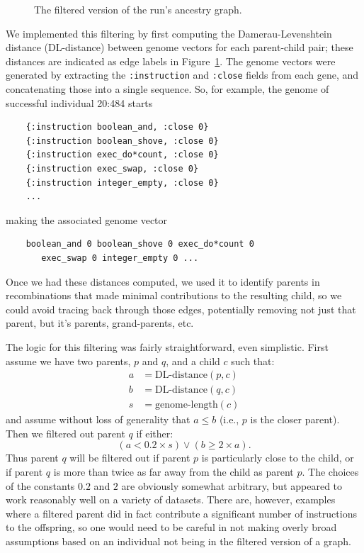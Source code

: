 \begin{figure}[tb!p]
\begin{center}
	\end{center}
	\caption{The filtered version of the run's ancestry graph.}
	\label{fig:run0Filtered}       %
\end{figure}

We implemented this filtering by first computing the Damerau-Levenshtein 
distance (DL-distance)
between genome vectors for each parent-child pair; these distances
are indicated as edge labels in Figure~\ref{fig:run0Filtered}. The genome
vectors were generated by extracting the \texttt{:instruction} and 
\texttt{:close} fields from each gene, and concatenating those into a
single sequence. So, for example, the genome of successful individual
20:484 starts

\begin{verbatim}
	{:instruction boolean_and, :close 0} 
	{:instruction boolean_shove, :close 0} 
	{:instruction exec_do*count, :close 0} 
	{:instruction exec_swap, :close 0} 
	{:instruction integer_empty, :close 0}
	...
\end{verbatim}

making the associated genome vector

\begin{verbatim}
	boolean_and 0 boolean_shove 0 exec_do*count 0 
	   exec_swap 0 integer_empty 0 ...
\end{verbatim}


Once we had these distances computed, we used it to identify parents in
recombinations that made minimal contributions to the resulting child, so
we could avoid tracing back through those edges, potentially removing not
just that parent, but it's parents, grand-parents, etc. 

The logic for this filtering was fairly straightforward, even simplistic.
First assume we have two parents, $p$ and $q$, and a child $c$ such that:
\begin{align*}
	a & = \textrm{DL-distance}(p, c) \\
	b & = \textrm{DL-distance}(q, c) \\
	s & = \textrm{genome-length}(c)
\end{align*}
and assume without loss of generality that $a \leq b$ (i.e., $p$ is the
closer parent). Then we filtered out parent $q$ if either:
\[
	(a < 0.2 \times s) \lor (b \geq 2 \times a).
\]
Thus parent $q$ will be filtered out if parent $p$ is particularly close to
the child, or if parent $q$ is more than twice as far away from the child as
parent $p$. The choices of the constants $0.2$ and $2$ are obviously somewhat
arbitrary, but appeared to work reasonably well on a variety of datasets. 
There are,
however, examples where a filtered parent did in fact contribute a significant
number of instructions to the offspring, so one would need to be careful in not
making overly broad assumptions based on an individual not being in the filtered
version of a graph.

